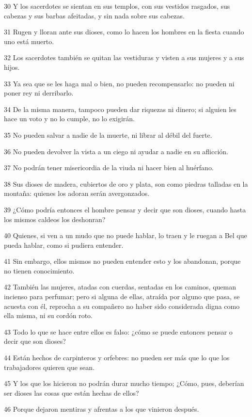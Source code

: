 \par 30 Y los sacerdotes se sientan en sus templos, con sus vestidos rasgados, sus cabezas y sus barbas afeitadas, y sin nada sobre sus cabezas.
\par 31 Rugen y lloran ante sus dioses, como lo hacen los hombres en la fiesta cuando uno está muerto.
\par 32 Los sacerdotes también se quitan las vestiduras y visten a sus mujeres y a sus hijos.
\par 33 Ya sea que se les haga mal o bien, no pueden recompensarlo: no pueden ni poner rey ni derribarlo.
\par 34 De la misma manera, tampoco pueden dar riquezas ni dinero; si alguien les hace un voto y no lo cumple, no lo exigirán.
\par 35 No pueden salvar a nadie de la muerte, ni librar al débil del fuerte.
\par 36 No pueden devolver la vista a un ciego ni ayudar a nadie en su aflicción.
\par 37 No podrán tener misericordia de la viuda ni hacer bien al huérfano.
\par 38 Sus dioses de madera, cubiertos de oro y plata, son como piedras talladas en la montaña: quienes los adoran serán avergonzados.
\par 39 ¿Cómo podría entonces el hombre pensar y decir que son dioses, cuando hasta los mismos caldeos los deshonran?
\par 40 Quienes, si ven a un mudo que no puede hablar, lo traen y le ruegan a Bel que pueda hablar, como si pudiera entender.
\par 41 Sin embargo, ellos mismos no pueden entender esto y los abandonan, porque no tienen conocimiento.
\par 42 También las mujeres, atadas con cuerdas, sentadas en los caminos, queman incienso para perfumar; pero si alguna de ellas, atraída por alguno que pasa, se acuesta con él, reprocha a su compañero no haber sido considerada digna como ella misma, ni su cordón roto.
\par 43 Todo lo que se hace entre ellos es falso: ¿cómo se puede entonces pensar o decir que son dioses?
\par 44 Están hechos de carpinteros y orfebres: no pueden ser más que lo que los trabajadores quieren que sean.
\par 45 Y los que los hicieron no podrán durar mucho tiempo; ¿Cómo, pues, deberían ser dioses las cosas que están hechas de ellos?
\par 46 Porque dejaron mentiras y afrentas a los que vinieron después.
